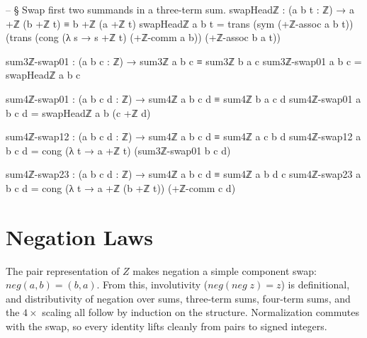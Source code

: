 \documentclass[11pt,a4paper]{book}
\def\mathrm#1{#1}%
\def\mathbb#1{#1}%
\begin{document}
\begin{code}
-- § Swap first two summands in a three-term sum.
swapHeadℤ : (a b t : ℤ) → a +ℤ (b +ℤ t) ≡ b +ℤ (a +ℤ t)
swapHeadℤ a b t =
  trans (sym (+ℤ-assoc a b t))
        (trans (cong (λ s → s +ℤ t) (+ℤ-comm a b))
               (+ℤ-assoc b a t))

sum3ℤ-swap01 : (a b c : ℤ) → sum3ℤ a b c ≡ sum3ℤ b a c
sum3ℤ-swap01 a b c = swapHeadℤ a b c

sum4ℤ-swap01 : (a b c d : ℤ) → sum4ℤ a b c d ≡ sum4ℤ b a c d
sum4ℤ-swap01 a b c d = swapHeadℤ a b (c +ℤ d)

sum4ℤ-swap12 : (a b c d : ℤ) → sum4ℤ a b c d ≡ sum4ℤ a c b d
sum4ℤ-swap12 a b c d = cong (λ t → a +ℤ t) (sum3ℤ-swap01 b c d)

sum4ℤ-swap23 : (a b c d : ℤ) → sum4ℤ a b c d ≡ sum4ℤ a b d c
sum4ℤ-swap23 a b c d = cong (λ t → a +ℤ (b +ℤ t)) (+ℤ-comm c d)
\end{code}

\section{Negation Laws}

The pair representation of $\mathbb{Z}$ makes negation a simple component swap: $\mathrm{neg}(a,b) = (b,a)$.
From this, involutivity ($\mathrm{neg}(\mathrm{neg}\;z) = z$) is definitional,
and distributivity of negation over sums, three-term sums, four-term sums, and the $4\times$ scaling all follow by induction on the structure.
Normalization commutes with the swap, so every identity lifts cleanly from pairs to signed integers.
\end{document}
